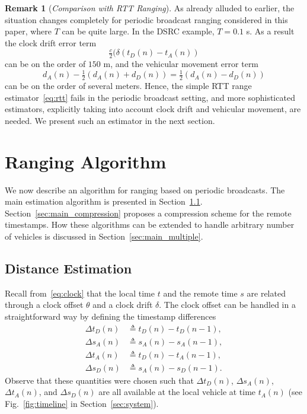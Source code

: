 \documentclass[12pt,journal,final,onecolumn]{IEEEtran}
\newcommand{\defeq}{\mathrel{\triangleq}}
\theoremstyle{definition}
\theoremstyle{myremark}
\newtheorem{remark}{Remark}
\newcommand{\dtd}{\Delta t_D}
\newcommand{\dta}{\Delta t_A}
\newcommand{\dsd}{\Delta s_D}
\newcommand{\dsa}{\Delta s_A}
\begin{document}
\begin{remark}[\emph{Comparison with RTT Ranging}]
    As already alluded to earlier, the situation changes completely for periodic
    broadcast ranging considered in this paper, where $T$ can be quite large.
    In the DSRC example, $T = 0.1$ s. As a result the clock drift error term
    \begin{equation*}
        \tfrac{c}{2}\bigl(\delta(t_D(n)-t_A(n))
    \end{equation*}
    can be on the order of $150$ m, and the vehicular movement error term
    \begin{equation*}
        d_A(n)-\tfrac{1}{2}(d_A(n)+d_D(n))
        = \tfrac{1}{2}(d_A(n)-d_D(n))
    \end{equation*}
    can be on the order of several meters. Hence, the simple RTT range
    estimator~\eqref{eq:rtt} fails in the periodic broadcast setting, and more
    sophisticated estimators, explicitly taking into account clock drift and
    vehicular movement, are needed. We present such an estimator in the next
    section.
\end{remark}


\section{Ranging Algorithm}
\label{sec:main}

We now describe an algorithm for ranging based on periodic broadcasts. The main
estimation algorithm is presented in Section~\ref{sec:main_poly}.
Section~\ref{sec:main_compression} proposes a compression scheme for the remote
timestamps. How these algorithms can be extended to handle arbitrary number of
vehicles is discussed in Section~\ref{sec:main_multiple}.


\subsection{Distance Estimation}
\label{sec:main_poly}

Recall from~\eqref{eq:clock} that the local time $t$ and the remote time $s$ are
related through a clock offset $\theta$ and a clock drift $\delta$. The clock
offset can be handled in a straightforward way by defining the timestamp
differences
\begin{align*}
    \dtd(n) & \defeq t_D(n)-t_D(n-1), \\
    \dsa(n) & \defeq s_A(n)-s_A(n-1), \\
    \dta(n) & \defeq t_D(n)-t_A(n-1), \\
    \dsd(n) & \defeq s_A(n)-s_D(n-1).
\end{align*}
Observe that these quantities were chosen such that
$\dtd(n)$, $\dsa(n)$, $\dta(n)$, and $\dsd(n)$ are all available
at the local vehicle at time $t_A(n)$ (see Fig.~\ref{fig:timeline} in
Section~\ref{sec:system}). 
\end{document}
